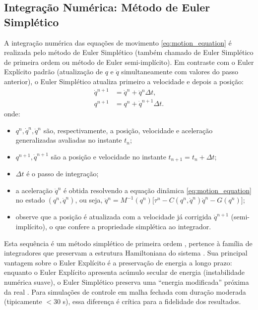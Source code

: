 \subsection{Integração Numérica: Método de Euler Simplético}

A integração numérica das equações de movimento \eqref{eq:motion_equation} é realizada pelo método de Euler Simplético (também chamado de Euler Simplético de primeira ordem ou método de Euler semi-implícito). Em contraste com o Euler Explícito padrão (atualização de $q$ e $\dot{q}$ simultaneamente com valores do passo anterior), o Euler Simplético atualiza primeiro a velocidade e depois a posição:
\begin{align}
    \dot{q}^{n+1} &= \dot{q}^n + \ddot{q}^n \Delta t, \label{eq:symplectic_euler1}\\
    q^{n+1} &= q^n + \dot{q}^{n+1} \Delta t. \label{eq:symplectic_euler2}
\end{align}
onde:
\begin{itemize}
    \item $q^n, \dot{q}^n, \ddot{q}^n$ são, respectivamente, a posição, velocidade e aceleração generalizadas avaliadas no instante $t_n$;
    \item $q^{n+1}, \dot{q}^{n+1}$ são a posição e velocidade no instante $t_{n+1} = t_n + \Delta t$;
    \item $\Delta t$ é o passo de integração;
    \item a aceleração $\ddot{q}^n$ é obtida resolvendo a equação dinâmica \eqref{eq:motion_equation} no estado $(q^n, \dot{q}^n)$, ou seja, $\ddot{q}^n = M^{-1}(q^n)\big[\tau^n - C(q^n,\dot{q}^n)\dot{q}^n - G(q^n)\big]$;
    \item observe que a posição é atualizada com a velocidade já corrigida $\dot{q}^{n+1}$ (semi-implícito), o que confere a propriedade simplética ao integrador.
\end{itemize}
Esta sequência é um método simplético de primeira ordem , pertence à família de integradores que preservam a estrutura Hamiltoniana do sistema \cite{leimkuhler2004simulating, hairer2006geometric}. Sua principal vantagem sobre o Euler Explícito é a preservação de energia a longo prazo: enquanto o Euler Explícito apresenta acúmulo secular de energia (instabilidade numérica suave), o Euler Simplético preserva uma ``energia modificada'' próxima da real \cite{leimkuhler2004simulating}. Para simulações de controle em malha fechada com duração moderada (tipicamente $< 30$ s), essa diferença é crítica para a fidelidade dos resultados.

